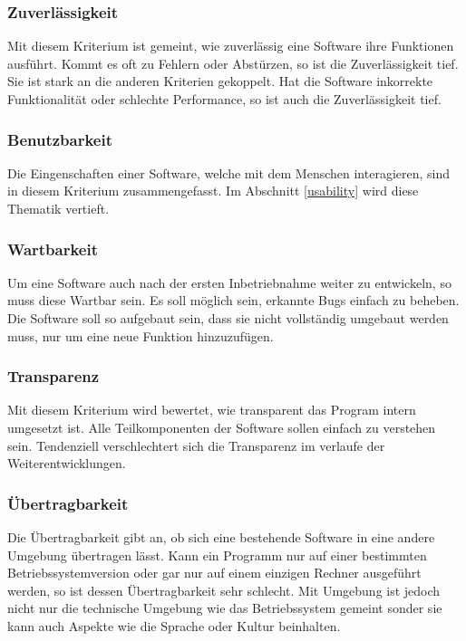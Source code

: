 \subsubsection{Zuverlässigkeit}
Mit diesem Kriterium ist gemeint, wie zuverlässig eine Software ihre Funktionen ausführt.
Kommt es oft zu Fehlern oder Abstürzen, so ist die Zuverlässigkeit tief.
Sie ist stark an die anderen Kriterien gekoppelt.
Hat die Software inkorrekte Funktionalität oder schlechte Performance, so ist auch die Zuverlässigkeit tief.

\subsubsection{Benutzbarkeit}
Die Eingenschaften einer Software, welche mit dem Menschen interagieren, sind in diesem Kriterium zusammengefasst.
Im Abschnitt \ref{usability} wird diese Thematik vertieft.

\subsubsection{Wartbarkeit}
Um eine Software auch nach der ersten Inbetriebnahme weiter zu entwickeln, so muss diese Wartbar sein.
Es soll möglich sein, erkannte Bugs einfach zu beheben.
Die Software soll so aufgebaut sein, dass sie nicht vollständig umgebaut werden muss, nur um eine neue Funktion hinzuzufügen.


\subsubsection{Transparenz}
Mit diesem Kriterium wird bewertet, wie transparent das Program intern umgesetzt ist.
Alle Teilkomponenten der Software sollen einfach zu verstehen sein.
Tendenziell verschlechtert sich die Transparenz im verlaufe der Weiterentwicklungen.


\subsubsection{Übertragbarkeit}
Die Übertragbarkeit gibt an, ob sich eine bestehende Software in eine andere Umgebung übertragen lässt.
Kann ein Programm nur auf einer bestimmten Betriebssystemversion oder gar nur auf einem einzigen Rechner ausgeführt werden, so ist dessen Übertragbarkeit sehr schlecht.
Mit Umgebung ist jedoch nicht nur die technische Umgebung wie das Betriebssystem gemeint sonder sie kann auch Aspekte wie die Sprache oder Kultur beinhalten.


